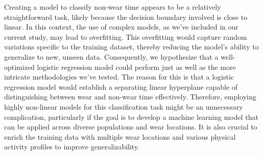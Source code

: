 \documentclass[
  9pt,
]{scrbook}
\begin{document}
Creating a model to classify non-wear time appears to be a relatively
straightforward task, likely because the decision boundary involved is
close to linear. In this context, the use of complex models, as we've
included in our current study, may lead to overfitting. This overfitting
would capture random variations specific to the training dataset,
thereby reducing the model's ability to generalize to new, unseen data.
Consequently, we hypothesize that a well-optimized logistic regression
model could perform just as well as the more intricate methodologies
we've tested. The reason for this is that a logistic regression model
would establish a separating linear hyperplane capable of distinguishing
between wear and non-wear time effectively. Therefore, employing highly
non-linear models for this classification task might be an unnecessary
complication, particularly if the goal is to develop a machine learning
model that can be applied across diverse populations and wear locations.
It is also crucial to enrich the training data with multiple wear
locations and various physical activity profiles to improve
generalizability.
\end{document}

